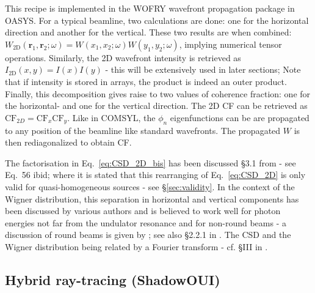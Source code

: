 \documentclass{iucr}              %
\newcommand{\inred}[1]{{\color{red}#1}}
\begin{document}
This recipe is implemented in the WOFRY wavefront propagation package in OASYS. For a typical beamline, two calculations are done: one for the horizontal direction and another for the vertical. These two results are when combined: $W_\text{2D}(\textbf{r}_1,\textbf{r}_2;\omega)=W(x_1,x_2;\omega) W(y_1,y_2;\omega)$, implying numerical tensor operations. Similarly, the 2D wavefront intensity is retrieved as $I_\text{2D}(x,y)=I(x) I(y)$ - this will be extensively used in later sections; Note that if intensity is stored in arrays, the product is indeed an outer product. Finally, this decomposition gives raise to two values of coherence fraction: one for the horizontal- and one for the vertical direction. The 2D CF can be retrieved as $\text{CF}_{2D}=\text{CF}_{x}\text{CF}_{y}$. Like in COMSYL, the $\phi_n$ eigenfunctions can be are propagated to any position of the beamline like standard wavefronts. The propagated $W$ is then rediagonalized to obtain CF. 


The factorisation in Eq.~\ref{eq:CSD_2D_bis} has been discussed §3.1 from \cite{geloni2008} - see Eq.~56 ibid; where it is stated that this rearranging of Eq.~\ref{eq:CSD_2D} is only valid for quasi-homogeneous sources - see \S\ref{sec:validity}. In the context of the Wigner distribution, this separation in horizontal and vertical components has been discussed by various authors and is believed to work well for photon energies not far from the undulator resonance and for non-round beams \cite{Bazarov2012,tanaka2014,nash2021} - \inred{a discussion of round beams is given by \citeasnoun{Agarwal2000}; see also \S2.2.1 in \cite{Gasbarro2014}}. The CSD and the Wigner distribution being related by a Fourier transform - cf. \S III in \cite{Bazarov2012}.


\subsection{Hybrid ray-tracing (ShadowOUI)}
\end{document}
